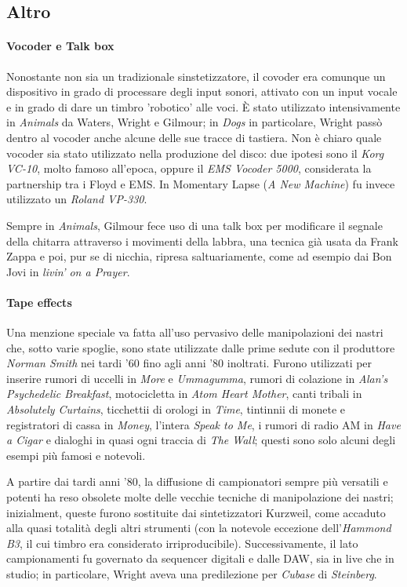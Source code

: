\documentclass[class=book, crop=false, oneside, 12pt]{standalone}
\begin{document}
    \subsection{Altro}
    \paragraph{Vocoder e Talk box}
    Nonostante non sia un tradizionale sinstetizzatore, il covoder era comunque un dispositivo in grado di processare degli input sonori, attivato con un input vocale e in grado di dare un timbro 'robotico' alle voci. È stato utilizzato intensivamente in \emph{Animals} da Waters, Wright e Gilmour; in \emph{Dogs} in particolare, Wright passò dentro al vocoder anche alcune delle sue tracce di tastiera. Non è chiaro quale vocoder sia stato utilizzato nella produzione del disco: due ipotesi sono il \emph{Korg VC-10}, molto famoso all'epoca, oppure il \emph{EMS Vocoder 5000}, considerata la partnership tra i Floyd e EMS. In Momentary Lapse (\emph{A New Machine}) fu invece utilizzato un \emph{ Roland VP-330}.

    Sempre in \emph{Animals}, Gilmour fece uso di una talk box per modificare il segnale della chitarra attraverso i movimenti della labbra, una tecnica già usata da Frank Zappa e poi, pur se di nicchia, ripresa saltuariamente, come ad esempio dai Bon Jovi in \emph{livin' on a Prayer}.

    \paragraph{Tape effects}
    Una menzione speciale va fatta all'uso pervasivo delle manipolazioni dei nastri che, sotto varie spoglie, sono state utilizzate dalle prime sedute con il produttore \emph{Norman Smith} nei tardi '60 fino agli anni '80 inoltrati. Furono utilizzati per inserire rumori di uccelli in \emph{More} e \emph{Ummagumma}, rumori di colazione in \emph{Alan's Psychedelic Breakfast}, motocicletta in \emph{Atom Heart Mother}, canti tribali in \emph{Absolutely Curtains}, ticchettii di orologi in \emph{Time}, tintinnii di monete e registratori di cassa in \emph{Money}, l'intera \emph{Speak to Me}, i rumori di radio AM in \emph{Have a Cigar} e dialoghi in quasi ogni traccia di \emph{The Wall}; questi sono solo alcuni degli esempi più famosi e notevoli. 

    A partire dai tardi anni '80, la diffusione di campionatori sempre più versatili e potenti ha reso obsolete molte delle vecchie tecniche di manipolazione dei nastri; inizialment, queste furono sostituite dai sintetizzatori Kurzweil, come accaduto alla quasi totalità degli altri strumenti (con la notevole eccezione dell'\emph{Hammond B3}, il cui timbro era considerato irriproducibile). Successivamente, il lato campionamenti fu governato da sequencer digitali e dalle DAW, sia in live che in studio; in particolare, Wright aveva una predilezione per \emph{Cubase} di \emph{Steinberg}.
\end{document}
